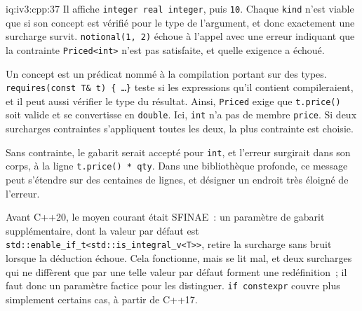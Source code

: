 \begin{solution}{iq:iv3:cpp:37}
Il affiche \texttt{integer real integer}, puis \texttt{10}. Chaque \texttt{kind} n'est viable que si son concept est vérifié pour le type de l'argument, et donc exactement une surcharge survit. \texttt{notional(1, 2)} échoue à l'appel avec une erreur indiquant que la contrainte \texttt{Priced<int>} n'est pas satisfaite, et quelle exigence a échoué.

Un concept est un prédicat nommé à la compilation portant sur des types. \texttt{requires(const T\& t) \{ \dots \}} teste si les expressions qu'il contient compileraient, et il peut aussi vérifier le type du résultat. Ainsi, \texttt{Priced} exige que \texttt{t.price()} soit valide et se convertisse en \texttt{double}. Ici, \texttt{int} n'a pas de membre \texttt{price}. Si deux surcharges contraintes s'appliquent toutes les deux, la plus contrainte est choisie.

Sans contrainte, le gabarit serait accepté pour \texttt{int}, et l'erreur surgirait dans son corps, à la ligne \texttt{t.price() * qty}. Dans une bibliothèque profonde, ce message peut s'étendre sur des centaines de lignes, et désigner un endroit très éloigné de l'erreur.

Avant C++20, le moyen courant était SFINAE~: un paramètre de gabarit supplémentaire, dont la valeur par défaut est \texttt{std::enable\_if\_t<std::is\_integral\_v<T>{}>}, retire la surcharge sans bruit lorsque la déduction échoue. Cela fonctionne, mais se lit mal, et deux surcharges qui ne diffèrent que par une telle valeur par défaut forment une redéfinition~; il faut donc un paramètre factice pour les distinguer. \texttt{if constexpr} couvre plus simplement certains cas, à partir de C++17.

\end{solution}

